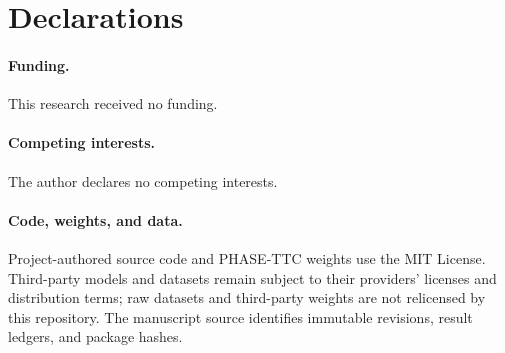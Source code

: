 \section*{Declarations}
\paragraph{Funding.} This research received no funding.
\paragraph{Competing interests.} The author declares no competing interests.
\paragraph{Code, weights, and data.} Project-authored source code and PHASE-TTC weights use the MIT License. Third-party models and datasets remain subject to their providers' licenses and distribution terms; raw datasets and third-party weights are not relicensed by this repository. The manuscript source identifies immutable revisions, result ledgers, and package hashes.
